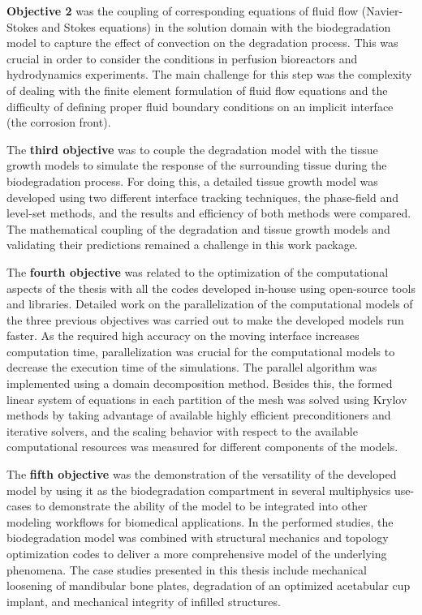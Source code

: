\textbf{Objective 2} was the coupling of corresponding equations of fluid flow (Navier-Stokes and Stokes equations) in the solution domain with the biodegradation model to capture the effect of convection on the degradation process. This was crucial in order to consider the conditions in perfusion bioreactors and hydrodynamics experiments. The main challenge for this step was the complexity of dealing with the finite element formulation of fluid flow equations and the difficulty of defining proper fluid boundary conditions on an implicit interface (the corrosion front).

The \textbf{third objective} was to couple the degradation model with the tissue growth models to simulate the response of the surrounding tissue during the biodegradation process. For doing this, a detailed tissue growth model was developed using two different interface tracking techniques, the phase-field and level-set methods, and the results and efficiency of both methods were compared. The mathematical coupling of the degradation and tissue growth models and validating their predictions remained a challenge in this work package.

The \textbf{fourth objective} was related to the optimization of the computational aspects of the thesis with  all the codes developed in-house using open-source tools and libraries. Detailed work on the parallelization of the computational models of the three previous objectives was carried out to make the developed models run faster. As the required high accuracy on the moving interface increases computation time, parallelization was crucial for the computational models to decrease the execution time of the simulations. The parallel algorithm was implemented using a domain decomposition method. Besides this, the formed linear system of equations in each partition of the mesh was solved using Krylov methods by taking advantage of available highly efficient preconditioners and iterative solvers, and the scaling behavior with respect to the available computational resources was measured for different components of the models.

The \textbf{fifth objective} was the demonstration of the versatility of the developed model  by using it as the biodegradation compartment in several multiphysics  use-cases to demonstrate the ability of the model to be integrated into other modeling workflows for biomedical applications. In the performed studies, the biodegradation model was combined with structural mechanics and topology optimization codes to deliver a more comprehensive model of the underlying phenomena. The case studies presented in this thesis include mechanical loosening of mandibular bone plates, degradation of an optimized acetabular cup implant, and mechanical integrity of infilled structures.


